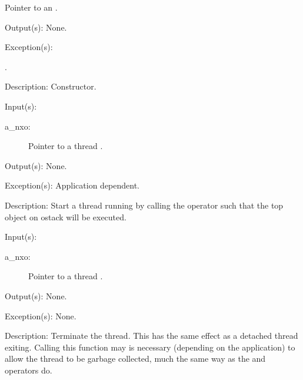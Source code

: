 \begin{capi}
\begin{capilist}
\begin{description}
			Pointer to an .
		\end{description}
	\item[Output(s): ] None.
	\item[Exception(s): ]
		\begin{description}\item[]
		\item[.]
		\end{description}
	\item[Description: ]
		Constructor.
	\end{capilist}
\label{nxo_thread_start}
	\begin{capilist}
	\item[Input(s): ]
		\begin{description}\item[]
		\item[a\_nxo: ]
			Pointer to a thread .
		\end{description}
	\item[Output(s): ] None.
	\item[Exception(s): ] Application dependent.
	\item[Description: ]
		Start a thread running by calling the 
		operator such that the top object on ostack will be executed.
	\end{capilist}
\label{nxo_thread_exit}
	\begin{capilist}
	\item[Input(s): ]
		\begin{description}\item[]
		\item[a\_nxo: ]
			Pointer to a thread \classname{nxo}.
		\end{description}
	\item[Output(s): ] None.
	\item[Exception(s): ] None.
	\item[Description: ]
		Terminate the thread.  This has the same effect as a detached
		thread exiting.  Calling this function may is necessary
		(depending on the application) to allow the thread to be garbage
		collected, much the same way as the \onyxop{}{detach}{} and
		 operators do.
	\end{capilist}
\label{nxo_thread_thread}

\end{capi}
